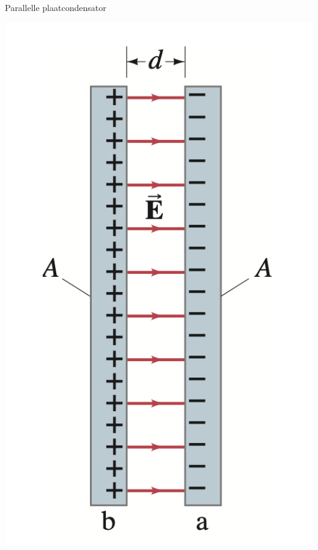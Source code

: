\begin{app}{Parallelle plaatcondensator}
\begin{minipage}{.2\textwidth}
        \includegraphics[scale = 0.43]{Images/Elektriciteit/ParallellePlatenCapaciteit.png}
    \end{minipage}
    
\end{app}



